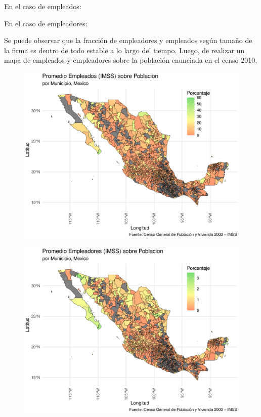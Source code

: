 \documentclass[9pt]{article}
\begin{document}
 En el caso de empleados:
 
  En el caso de empleadores:
 
 
  Se puede observar que la fracci\'on de empleadores y empleados seg\'un tama\~no de la firma es dentro de todo estable a lo largo del tiempo. 
 \newpage
Luego, de realizar un mapa de empleados y empleadores sobre la poblaci\'on enunciada en el censo 2010, 
 \begin{figure}[H]
     \centering
     \includegraphics[width=\textwidth]{figs/employeespob.eps}
 \end{figure}
  \begin{figure}[H]
     \centering
     \includegraphics[width=\textwidth]{figs/employerspob.eps}
 \end{figure}



\printbibliography 
\end{document}
